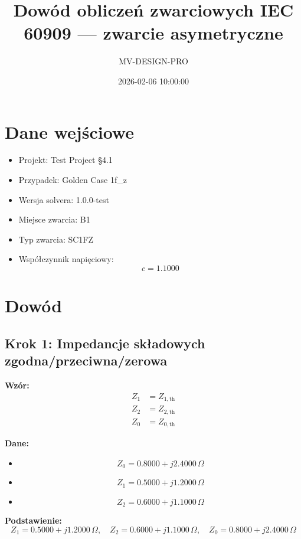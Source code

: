 \documentclass[11pt,a4paper]{article}
\title{Dowód obliczeń zwarciowych IEC 60909 — zwarcie asymetryczne}
\author{MV-DESIGN-PRO}
\date{2026-02-06 10:00:00}
\begin{document}
\maketitle

\tableofcontents

\newpage

\section{Dane wejściowe}
\begin{itemize}
  \item Projekt: Test Project §4.1
  \item Przypadek: Golden Case 1f\_z
  \item Wersja solvera: 1.0.0-test
  \item Miejsce zwarcia: B1
  \item Typ zwarcia: SC1FZ
  \item Współczynnik napięciowy:
$$
c = 1.1000
$$
\end{itemize}





\section{Dowód}

\subsection{Krok 1: Impedancje składowych zgodna/przeciwna/zerowa}

\textbf{Wzór:}
$$
\begin{aligned}Z_1 &= Z_{1,\mathrm{th}} \\Z_2 &= Z_{2,\mathrm{th}} \\Z_0 &= Z_{0,\mathrm{th}}\end{aligned}
$$

\textbf{Dane:}
\begin{itemize}
  \item
$$
Z_0 = 0.8000 + j2.4000\,\Omega
$$
  \item
$$
Z_1 = 0.5000 + j1.2000\,\Omega
$$
  \item
$$
Z_2 = 0.6000 + j1.1000\,\Omega
$$
\end{itemize}

\textbf{Podstawienie:}
$$
Z_1 = 0.5000 + j1.2000\,\Omega, \quad Z_2 = 0.6000 + j1.1000\,\Omega, \quad Z_0 = 0.8000 + j2.4000\,\Omega
$$
\end{document}
